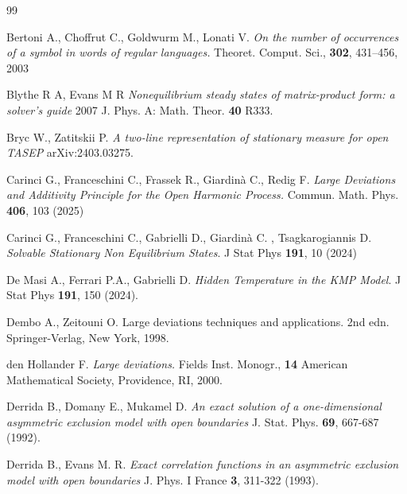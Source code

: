 \documentclass[reqno]{amsart}
\theoremstyle{plain}
\theoremstyle{definition}
\theoremstyle{remark}
\numberwithin{equation}{section}
\numberwithin{theorem}{section}
\newcommand{\<}{\langle}
\renewcommand{\>}{\rangle}
\begin{document}
	\begin{thebibliography}{99}
		
		
		
		 Bertoni A., Choffrut C., Goldwurm M., Lonati V. {\it On the number
			of occurrences of a symbol in words of regular languages.} Theoret.
		Comput. Sci., {\bf 302}, 431–456, 2003
		
		 Blythe R A, Evans M R {\it Nonequilibrium steady states of matrix-product form: a solver's guide} 2007 J. Phys. A: Math. Theor. {\bf 40} R333.
		
		 Bryc W., Zatitskii P. {\it A two-line representation of stationary measure for open
			TASEP} arXiv:2403.03275.
		
		 Carinci G., Franceschini C., Frassek R., Giardinà C., Redig F.  {\it Large Deviations and Additivity Principle for the Open Harmonic Process.} Commun. Math. Phys. {\bf 406}, 103 (2025)
		
		 Carinci G., Franceschini C., Gabrielli D., Giardinà C. , Tsagkarogiannis D.  {\it Solvable Stationary Non Equilibrium States}. J Stat Phys {\bf 191}, 10 (2024)
		
		 De Masi A., Ferrari P.A., Gabrielli D. {\it Hidden Temperature in the KMP Model}. J Stat Phys {\bf 191}, 150 (2024).
		
		Dembo A., Zeitouni O.
		Large deviations techniques and applications. 2nd edn.
		Springer-Verlag, New York, 1998. 
		
		 den Hollander F.
		{\it Large deviations.}
		Fields Inst. Monogr., {\bf 14}
		American Mathematical Society, Providence, RI, 2000.
		
		 Derrida B., Domany E., Mukamel D. {\it An exact solution of a one-dimensional asymmetric exclusion model with open boundaries} J. Stat. Phys. {\bf 69}, 667-687 (1992).
		
		 Derrida B., Evans M. R. {\it Exact correlation functions in an asymmetric exclusion model with open boundaries} J. Phys. I France {\bf 3}, 311-322 (1993).
		

\end{thebibliography}
\end{document}
